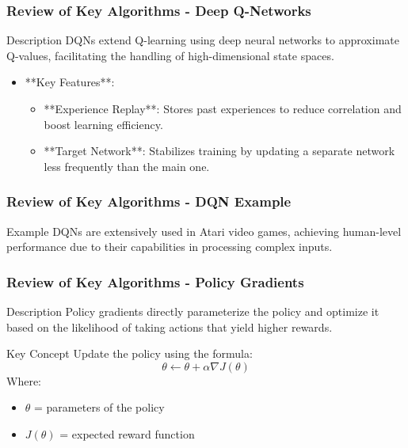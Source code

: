 \documentclass[aspectratio=169]{beamer}
\begin{document}
\begin{frame}[fragile]
    \frametitle{Review of Key Algorithms - Deep Q-Networks}
    \begin{block}{Description}
        DQNs extend Q-learning using deep neural networks to approximate Q-values, facilitating the handling of high-dimensional state spaces.
    \end{block}
    \begin{itemize}
        \item **Key Features**:
        \begin{itemize}
            \item **Experience Replay**: Stores past experiences to reduce correlation and boost learning efficiency.
            \item **Target Network**: Stabilizes training by updating a separate network less frequently than the main one.
        \end{itemize}
    \end{itemize}
\end{frame}

\begin{frame}[fragile]
    \frametitle{Review of Key Algorithms - DQN Example}
    \begin{block}{Example}
        DQNs are extensively used in Atari video games, achieving human-level performance due to their capabilities in processing complex inputs.
    \end{block}
\end{frame}

\begin{frame}[fragile]
    \frametitle{Review of Key Algorithms - Policy Gradients}
    \begin{block}{Description}
        Policy gradients directly parameterize the policy and optimize it based on the likelihood of taking actions that yield higher rewards.
    \end{block}
    \begin{block}{Key Concept}
        Update the policy using the formula:
        \begin{equation}
            \theta \leftarrow \theta + \alpha \nabla J(\theta)
        \end{equation}
        Where:
        \begin{itemize}
            \item \(\theta\) = parameters of the policy
            \item \(J(\theta)\) = expected reward function
        \end{itemize}
    \end{block}
\end{frame}
\end{document}
